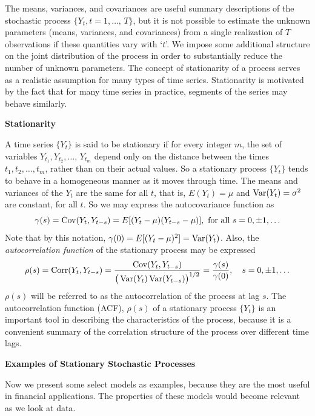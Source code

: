 The means, variances, and covariances are useful summary descriptions of the stochastic process $\{ Y_t, t=1,\ldots,\,T \}$, but it is not possible to estimate the unknown parameters (means, variances, and covariances) from a single realization of $T$ observations if these quantities vary with `$t$'. We impose some additional structure on the joint distribution of the process in order to substantially reduce the number of unknown parameters. The concept of stationarity of a process serves as a realistic assumption for many types of time series. Stationarity is motivated by the fact that for many time series in practice, segments of the series may behave similarly. \twomedskip


\noindent\textbf{Stationarity} \twomedskip


A time series $\{Y_t \}$ is said to be stationary if for every integer $m$, the set of variables $Y_{t_1}, Y_{t_2}, \ldots, \, Y_{t_m}$ depend only on the distance between the times $t_1, t_2, \ldots, t_m$, rather than on their actual values.  So a stationary process $\{Y_t \}$ tends to behave in a homogeneous manner as it moves through time. The means and variances of the $Y_t$ are the same for all $t$, that is, $E(Y_t) = \mu$ and  $\operatorname{Var}(Y_t)= \sigma^2$ are constant, for all $t$. So we may express the autocovariance function as 
	\begin{equation} \label{eqn:2gammas}
	\gamma(s)= \cov(Y_t,Y_{t - s})= E[(Y_t - \mu)(Y_{t - s} - \mu)], \text{ for all } s= 0, \pm 1, \ldots
	\end{equation}
Note that by this notation, $\gamma(0) = E[(Y_t - \mu)^2] = \operatorname{Var}(Y_t)$. Also, the \emph{autocorrelation function} of the stationary process may be expressed
        	\begin{equation} \label{eqn:2rhos}
	\rho(s)= \corr(Y_t,Y_{t - s})= \dfrac{\cov(Y_t,Y_{t - s})}{\big( \var(Y_t) \var(Y_{t-s}) \big)^{1/2}} = \dfrac{\gamma(s)}{\gamma(0)},  \quad  s= 0, \pm 1, \ldots
	\end{equation}
$\rho(s)$ will be referred to as the autocorrelation of the process at lag $s$. The autocorrelation function (ACF), $\rho(s)$ of a stationary process $\{Y_t\}$ is an important tool in describing the characteristics of the process, because it is a convenient summary of the correlation structure of the process over different time lags.  \twomedskip


\noindent \textbf{Examples of Stationary Stochastic Processes} \twomedskip


Now we present some select models as examples, because they are the most useful in financial applications. The properties of these models would become relevant as we look at data. 


